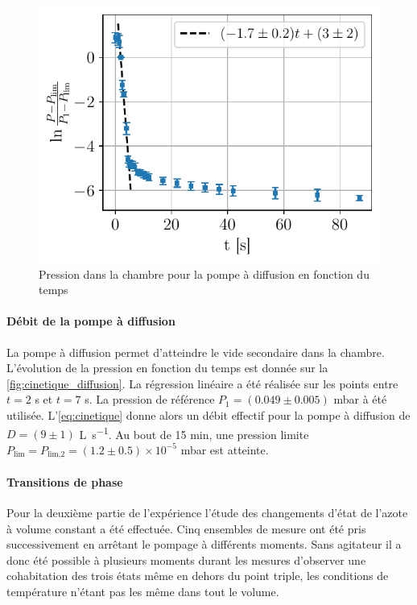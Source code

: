 \begin{minipage}{\textwidth}
    \begin{figure}
        \centering
        \includegraphics[width=\linewidth]{figures/cinetique_diffusion.pdf}
        \caption{Pression dans la chambre pour la pompe à diffusion en fonction du temps}
        \label{fig:cinetique_diffusion}
    \end{figure}
    
    \paragraph*{Débit de la pompe à diffusion}
    La pompe à diffusion permet d'atteindre le vide secondaire dans la chambre. L'évolution de la pression en fonction du temps est donnée sur la \autoref{fig:cinetique_diffusion}. La régression linéaire a été réalisée sur les points entre \(t = 2\) \si{\second} et \(t = 7\) \si{\second}. La pression de référence \(P_1 = (0.049 \pm 0.005)\) \si{\milli\bar} à été utilisée. L'\autoref{eq:cinetique} donne alors un débit effectif pour la pompe à diffusion de \(D = (9 \pm 1)\) \si{\liter \per \second}. Au bout de 15 \si{\minute}, une pression limite \(P_\textrm{lim} = P_\textrm{lim,2} = (1.2 \pm 0.5) \times 10^{-5}\) \si{\milli\bar} est atteinte.

    \paragraph{Transitions de phase}
    Pour la deuxième partie de l'expérience l'étude des changements d'état de l'azote à volume constant a été effectuée. Cinq ensembles de mesure ont été pris successivement en arrêtant le pompage à différents moments. Sans agitateur il a donc été possible à plusieurs moments durant les mesures d'observer une cohabitation des trois états même en dehors du point triple, les conditions de température n'étant pas les même dans tout le volume.
\end{minipage}

